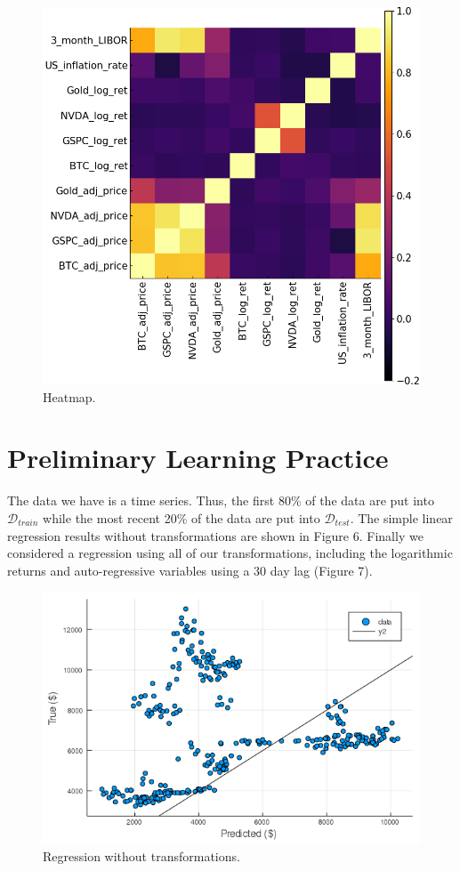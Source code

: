 \documentclass[9pt,twocolumn,twoside]{ilcss}
\begin{document}
\begin{figure}[tbhp]
\centering
\includegraphics[width=0.8\linewidth]{heatmap.png}
\caption{Heatmap.}
\label{fig:5}
\end{figure}

\section{Preliminary Learning Practice}
The data we have is a time series. Thus, the first 80\% of the data are put into $\mathcal{D}_{train}$ while the most recent 20\% of the data are put into $\mathcal{D}_{test}$. The simple linear regression results without transformations are shown in Figure 6. Finally we considered a regression using all of our transformations, including the logarithmic returns and auto-regressive variables using a 30 day lag (Figure 7).

\begin{figure}[tbhp]
\centering
\includegraphics[width=1.0\linewidth]{Regression_wo_all_explanatory.png}
\caption{Regression without transformations.}
\label{fig:9}
\end{figure}
\end{document}
